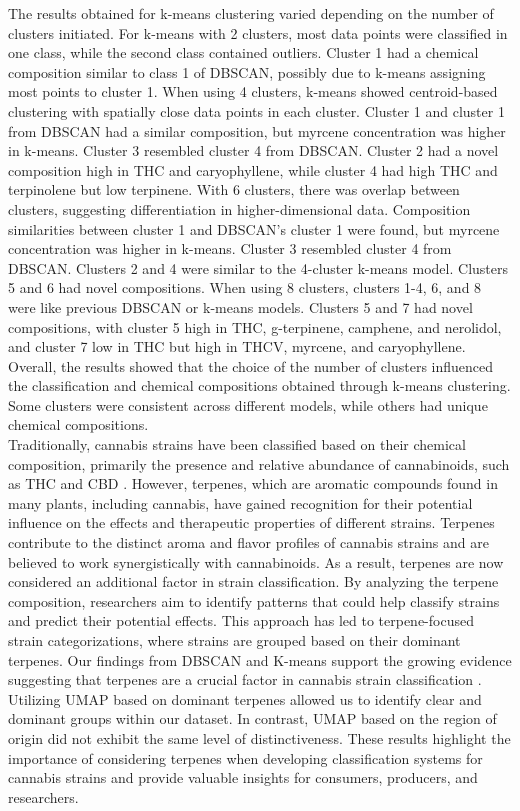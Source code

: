 \documentclass[11pt,a4paper]{article}
\newcommand{\noi}{\noindent}
\begin{document}
\noi
The results obtained for k-means clustering varied depending on the number of clusters initiated. For k-means with 2 clusters, most data points were classified in one class, while the second class contained outliers. Cluster 1 had a chemical composition similar to class 1 of DBSCAN, possibly due to k-means assigning most points to cluster 1. When using 4 clusters, k-means showed centroid-based clustering with spatially close data points in each cluster. Cluster 1 and cluster 1 from DBSCAN had a similar composition, but myrcene concentration was higher in k-means. Cluster 3 resembled cluster 4 from DBSCAN. Cluster 2 had a novel composition high in THC and caryophyllene, while cluster 4 had high THC and terpinolene but low terpinene. With 6 clusters, there was overlap between clusters, suggesting differentiation in higher-dimensional data. Composition similarities between cluster 1 and DBSCAN's cluster 1 were found, but myrcene concentration was higher in k-means. Cluster 3 resembled cluster 4 from DBSCAN. Clusters 2 and 4 were similar to the 4-cluster k-means model. Clusters 5 and 6 had novel compositions. When using 8 clusters, clusters 1-4, 6, and 8 were like previous DBSCAN or k-means models. Clusters 5 and 7 had novel compositions, with cluster 5 high in THC, g-terpinene, camphene, and nerolidol, and cluster 7 low in THC but high in THCV, myrcene, and caryophyllene. Overall, the results showed that the choice of the number of clusters influenced the classification and chemical compositions obtained through k-means clustering. Some clusters were consistent across different models, while others had unique chemical compositions.\\

\noi
Traditionally, cannabis strains have been classified based on their chemical composition, primarily the presence and relative abundance of cannabinoids, such as THC and CBD \cite{atakan2012cannabis}. However, terpenes, which are aromatic compounds found in many plants, including cannabis, have gained recognition for their potential influence on the effects and therapeutic properties of different strains. Terpenes contribute to the distinct aroma and flavor profiles of cannabis strains and are believed to work synergistically with cannabinoids. As a result, terpenes are now considered an additional factor in strain classification. By analyzing the terpene composition, researchers aim to identify patterns that could help classify strains and predict their potential effects. This approach has led to terpene-focused strain categorizations, where strains are grouped based on their dominant terpenes. Our findings from DBSCAN and K-means support the growing evidence suggesting that terpenes are a crucial factor in cannabis strain classification \cite{hanuvs2020terpenes}. Utilizing UMAP based on dominant terpenes allowed us to identify clear and dominant groups within our dataset. In contrast, UMAP based on the region of origin did not exhibit the same level of distinctiveness. These results highlight the importance of considering terpenes when developing classification systems for cannabis strains and provide valuable insights for consumers, producers, and researchers.\\
\end{document}
